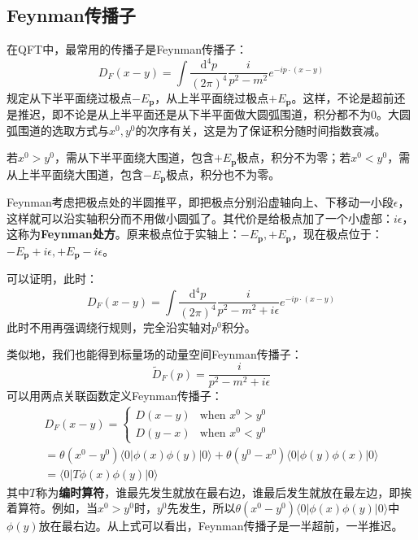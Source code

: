 \documentclass{book}
\begin{document}
\subsection{Feynman传播子}
在QFT中，最常用的传播子是Feynman传播子：
$$
D_F(x-y)=\int\frac{\mathrm{d}^4p}{(2\pi)^4}\frac{i}{p^2-m^2}e^{-ip\cdot(x-y)}
$$
规定从下半平面绕过极点$-E_\mathbf{p}$，从上半平面绕过极点$+E_\mathbf{p}$。这样，不论是超前还是推迟，即不论是从上半平面还是从下半平面做大圆弧围道，积分都不为$0$。大圆弧围道的选取方式与$x^0,y^0$的次序有关，这是为了保证积分随时间指数衰减。

若$x^0>y^0$，需从下半平面绕大围道，包含$+E_\mathbf{p}$极点，积分不为零；若$x^0<y^0$，需从上半平面绕大围道，包含$-E_\mathbf{p}$极点，积分也不为零。

Feynman考虑把极点处的半圆推平，即把极点分别沿虚轴向上、下移动一小段$\epsilon$，这样就可以沿实轴积分而不用做小圆弧了。其代价是给极点加了一个小虚部：$i\epsilon$，这称为\textbf{Feynman处方}。原来极点位于实轴上：$-E_\mathbf{p},+E_\mathbf{p}$，现在极点位于：$-E_\mathbf p+i\epsilon,+E_\mathbf p-i\epsilon$。

可以证明，此时：
$$
D_F(x-y)=\int\frac{\mathrm{d}^4p}{(2\pi)^4}\frac{i}{p^2-m^2+i\epsilon}e^{-ip\cdot(x-y)}
$$
此时不用再强调绕行规则，完全沿实轴对$p^0$积分。

类似地，我们也能得到标量场的动量空间Feynman传播子：
$$
\widetilde{D}_F(p)=\frac{i}{p^2-m^2+i\epsilon}
$$
可以用两点关联函数定义Feynman传播子：
\begin{gather*}
	D_F(x-y) = 
	\begin{cases}
		D(x-y) & \text{when } x^0 > y^0 \\
		D(y-x) & \text{when } x^0 < y^0
	\end{cases} \\
	= \theta(x^0 - y^0)\langle 0|\phi(x)\phi(y)|0\rangle 
	+ \theta(y^0 - x^0)\langle 0|\phi(y)\phi(x)|0\rangle \\
	= \langle 0|T\phi(x)\phi(y)|0\rangle
\end{gather*}
其中$T$称为\textbf{编时算符}，谁最先发生就放在最右边，谁最后发生就放在最左边，即挨着算符。例如，当$x^0>y^0$时，$y^0$先发生，所以$\theta(x^0-y^0)\langle0|\phi(x)\phi(y)|0\rangle$中$\phi(y)$放在最右边。从上式可以看出，Feynman传播子是一半超前，一半推迟。
\end{document}
